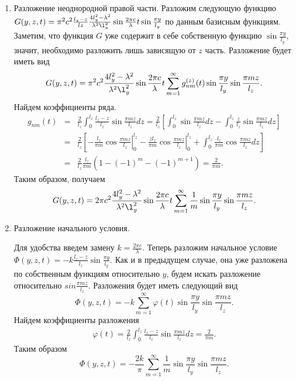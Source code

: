 \begin{enumerate}
\item Разложение неоднородной правой части.
  Разложим следующую функцию $G(y, z, t) = \pi^2 c^2\frac{l_z - z}{lz}\frac{4l_y^2 - \lambda^2}{\lambda^2 \l_y^2}\sin\frac{2\pi c}{\lambda}t \sin\frac{\pi y}{l_y}$ по данным базисным функциям. Заметим, что функция $G$ уже содержит в себе собственную функцию $\sin\frac{\pi y}{l_y}$, значит, необходимо разложить лишь зависящую от $z$ часть. Разложение будет иметь вид
  \[
  G(y, z, t) =  \pi^2 c^2 \frac{4l_y^2 - \lambda^2}{\lambda^2 \l_y^2} \sin\frac{2\pi c}{\lambda}t\displaystyle \sum_{m=1}^{\infty}  g_{nm}^{(z)}(t) \sin\frac{\pi y}{l_y} \sin\frac{\pi m z}{l_z}.
  \]
  Найдем коэффициенты ряда. 
  \begin{eqnarray*}
    g_{nm}(t) &=& \frac{2}{l_z} \displaystyle \int_0^{l_z} \frac{l_z - z}{l_z} \sin\frac{\pi m z}{l_z} dz = \frac{2}{l_z}\left[\int_0^{l_z}\sin\frac{\pi m z}{l_z}dz - \int_0^{l_z}\frac{z}{l_z} \sin\frac{\pi m z}{l_z}dz\right]\\
    &=& \frac{2}{l_z} \left[ \left. -\frac{l_z}{\pi m} \cos\frac{\pi m z}{l_z}\right|_{0}^{l_z} - \left. \frac{z l_z}{\pi m}\cos\frac{\pi m z}{l_z}\right|_{0}^{l_z} + \int_0^{l_z}\frac{l_z}{\pi m}\cos\frac{\pi m z}{l_z}dz\right]\\
    &=& \frac{2}{l_z}\frac{l_z}{\pi m} \left( 1 - (-1)^m - (-1)^{m+1} \right) = \frac{2}{\pi m}.
  \end{eqnarray*}
  Таким образом, получаем
  \[
  G(y, z, t) = 2\pi c^2\frac{4l_y^2 - \lambda^2}{\lambda^2 \l_y^2} \sin\frac{2\pi c}{\lambda}t\displaystyle \sum_{m=1}^{\infty}\frac{1}{m}\sin\frac{\pi y}{l_y} \sin\frac{\pi m z}{l_z}.
  \]

\item Разложение начального условия.


  Для удобства введем замену $k = \frac{2\pi c}{\lambda}$. Теперь разложим начальное условие  $\Phi(y, z, t) = -k\frac{l_z - z}{l_z}\sin\frac{\pi y}{l_y}$. Как и в предыдущем случае, она уже разложена по собственным функциям относительно $y$, будем искать разложение относительно $sin\frac{\pi m z}{l_z}$. Разложения будет иметь следующий вид
  \[
  \Phi(y, z, t) = \displaystyle -k\sum_{m=1}^{\infty}\varphi(t) \sin\frac{\pi y}{l_y} \sin\frac{\pi m z}{l_z}.
  \]
  Найдем коэффициенты разложения
  \begin{eqnarray*}
    \varphi(t) = \displaystyle \frac{2}{l_z} \int_0^{l_z} \frac{l_z - z}{l_z}\sin\frac{\pi m z}{l_z}dz = \frac{2}{\pi m}.
  \end{eqnarray*}
  Таким образом
  \[
  \Phi(y, z, t) = -\frac{2k}{\pi}\displaystyle \sum_{m=1}^{\infty} \frac{1}{m} \sin\frac{\pi y}{l_y} \sin\frac{\pi m z}{l_z}.
  \]
\end{enumerate}

